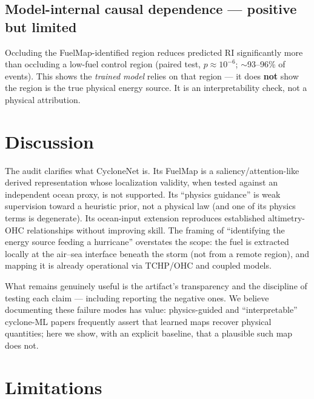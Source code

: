 \documentclass[11pt]{article}
\begin{document}
\subsection{Model-internal causal dependence --- positive but limited}

Occluding the FuelMap-identified region reduces predicted RI significantly
more than occluding a low-fuel control region (paired test,
$p \approx 10^{-6}$; $\sim$93--96\% of events). This shows the \emph{trained
model} relies on that region --- it does \textbf{not} show the region is the
true physical energy source. It is an interpretability check, not a physical
attribution.

\section{Discussion}

The audit clarifies what CycloneNet is. Its FuelMap is a
saliency/attention-like derived representation whose localization validity,
when tested against an independent ocean proxy, is not supported. Its
``physics guidance'' is weak supervision toward a heuristic prior, not a
physical law (and one of its physics terms is degenerate). Its ocean-input
extension reproduces established altimetry-OHC relationships without
improving skill. The framing of ``identifying the energy source feeding a
hurricane'' overstates the scope: the fuel is extracted locally at the
air--sea interface beneath the storm (not from a remote region), and mapping
it is already operational via TCHP/OHC and coupled models.

What remains genuinely useful is the artifact's transparency and the
discipline of testing each claim --- including reporting the negative ones.
We believe documenting these failure modes has value: physics-guided and
``interpretable'' cyclone-ML papers frequently assert that learned maps
recover physical quantities; here we show, with an explicit baseline, that a
plausible such map does not.

\section{Limitations}
\end{document}
